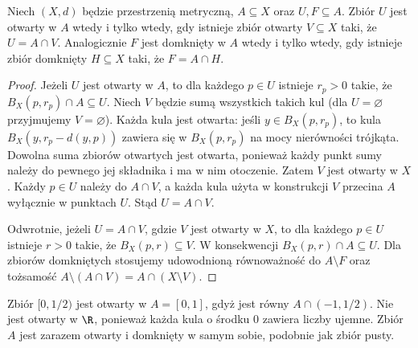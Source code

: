 \begin{lemat}
\label{ma1:lem:relative-open-representation}
Niech $(X,d)$ będzie przestrzenią metryczną, $A\subseteq X$ oraz $U,F\subseteq A$. Zbiór $U$ jest otwarty w $A$ wtedy i tylko wtedy, gdy istnieje zbiór otwarty $V\subseteq X$ taki, że $U=A\cap V$. Analogicznie $F$ jest domknięty w $A$ wtedy i tylko wtedy, gdy istnieje zbiór domknięty $H\subseteq X$ taki, że $F=A\cap H$.
\end{lemat}
\begin{proof}
Jeżeli $U$ jest otwarty w $A$, to dla każdego $p\in U$ istnieje $r_p>0$ takie, że $B_X(p,r_p)\cap A\subseteq U$. Niech $V$ będzie sumą wszystkich takich kul (dla $U=\varnothing$ przyjmujemy $V=\varnothing$). Każda kula jest otwarta: jeśli $y\in B_X(p,r_p)$, to kula $B_X(y,r_p-d(y,p))$ zawiera się w $B_X(p,r_p)$ na mocy nierówności trójkąta. Dowolna suma zbiorów otwartych jest otwarta, ponieważ każdy punkt sumy należy do pewnego jej składnika i ma w nim otoczenie. Zatem $V$ jest otwarty w $X$. Każdy $p\in U$ należy do $A\cap V$, a każda kula użyta w konstrukcji $V$ przecina $A$ wyłącznie w punktach $U$. Stąd $U=A\cap V$.

Odwrotnie, jeżeli $U=A\cap V$, gdzie $V$ jest otwarty w $X$, to dla każdego $p\in U$ istnieje $r>0$ takie, że $B_X(p,r)\subseteq V$. W konsekwencji $B_X(p,r)\cap A\subseteq U$. Dla zbiorów domkniętych stosujemy udowodnioną równoważność do $A\setminus F$ oraz tożsamość $A\setminus(A\cap V)=A\cap(X\setminus V)$.
\end{proof}

\begin{przyklad}
\label{ma1:ex:relative-open}
Zbiór $[0,1/2)$ jest otwarty w $A=[0,1]$, gdyż jest równy $A\cap(-1,1/2)$. Nie jest otwarty w $\R$, ponieważ każda kula o środku $0$ zawiera liczby ujemne. Zbiór $A$ jest zarazem otwarty i domknięty w samym sobie, podobnie jak zbiór pusty.
\end{przyklad}

